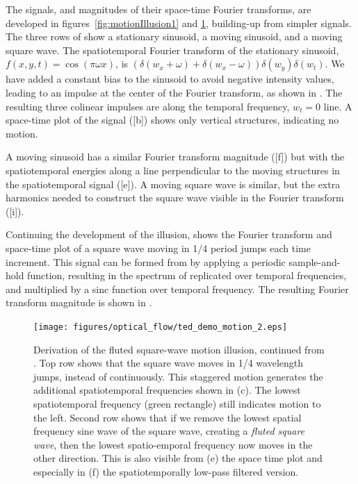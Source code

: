 The signals, and magnitudes of their space-time Fourier transforms, are developed in figures~\ref{fig:motionIllusion1} and \ref{fig:motionIllusion2}, building-up from simpler signals.  The three rows of \fig{\ref{fig:motionIllusion1}} show a stationary sinusoid, a moving sinusoid, and a moving square wave.  The spatiotemporal Fourier transform of the stationary sinusoid, $f(x,y,t) = \cos(\pi \omega x)$, is $(\delta(w_x + \omega) + \delta(w_x - \omega)) \delta(w_y) \delta(w_t) $.  We have added a constant bias to the sinusoid to avoid negative intensity values, leading to an impulse at the center of the Fourier transform, as shown in .  The resulting three colinear impulses are along the temporal frequency, $w_t = 0$ line.  A space-time plot of the signal (\fig{\ref{fig:motionIllusion1}}[b]) shows only vertical structures, indicating no motion.

A moving sinusoid has a similar Fourier transform magnitude (\fig{\ref{fig:motionIllusion1}}[f]) but with the spatiotemporal energies along a line perpendicular to the moving structures in the spatiotemporal signal (\fig{\ref{fig:motionIllusion1}}[e]).  A moving square wave is similar, but the extra harmonics needed to construct the square wave visible in the Fourier transform (\fig{\ref{fig:motionIllusion1}}[i]).

Continuing the development of the illusion,  shows the Fourier transform and space-time plot of a square wave moving in 1/4 period jumps each time increment.  This signal can be formed from  by applying a periodic sample-and-hold function, resulting in the spectrum of   replicated over temporal frequencies, and multiplied by a sinc function over temporal frequency.  The resulting Fourier transform magnitude is shown in .  


\begin{figure}[t]
\texttt{[image: figures/optical\_flow/ted\_demo\_motion\_2.eps]}
\caption{Derivation of the fluted square-wave motion illusion, continued from \fig{\ref{fig:motionIllusion1}}. Top row shows that the square wave moves in 1/4 wavelength jumps, instead of continuously. This staggered motion generates the additional spatiotemporal frequencies shown in (c).  The lowest spatiotemporal frequency (green rectangle) still indicates motion to the left.  Second row shows that if we remove the lowest spatial frequency sine wave of the square wave, creating a {\em fluted square wave}, then the lowest spatio-emporal frequency now moves in the other direction.  This is also visible from (e) the space time plot and especially in (f) the spatiotemporally low-pass filtered version.}
\label{fig:motionIllusion2}
\end{figure}

